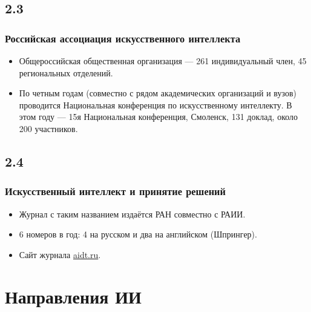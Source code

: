 \documentclass[default]{beamer}
\begin{document}
	\subsection{2.3}
	\begin{frame}
		\frametitle{Российская ассоциация искусственного интеллекта}
		
		\begin{itemize}
			\item Общероссийская общественная организация --- 261 индивидуальный член, 45 региональных отделений.
			\item По четным годам (совместно с рядом академических организаций и вузов) проводится Национальная конференция по искусственному интеллекту. В этом году --- 15я Национальная конференция, Смоленск, 131 доклад, около 200 участников.
		\end{itemize}
	\end{frame}

	\subsection{2.4}
	\begin{frame}
		\frametitle{Искусственный интеллект и принятие решений}
		\Large
		\begin{itemize}
			\item Журнал с таким названием издаётся РАН совместно с РАИИ.
			\item 6 номеров в год: 4 на русском и два на английском (Шпрингер).
			\item Сайт журнала \href{aidt.ru}{aidt.ru}.
		\end{itemize}
	\end{frame}

	\section{Направления ИИ}
\end{document}
